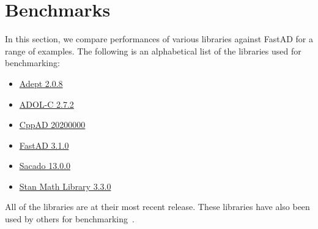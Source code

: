 \section{Benchmarks}\label{sec:benchmark}

In this section, we compare performances of 
various libraries against FastAD for a range of examples\footnotemark.
The following is an alphabetical list of the libraries used for benchmarking:\@
\begin{itemize}
    \item \href{http://www.met.reading.ac.uk/clouds/adept/}{Adept 2.0.8}~\cite{hogan:2014}
    \item \href{https://github.com/coin-or/ADOL-C}{ADOL-C 2.7.2}~\cite{griewank:1996}
    \item \href{https://coin-or.github.io/CppAD/doc/cppad.htm}{CppAD 20200000}~\cite{bell:2020}
    \item \href{https://github.com/JamesYang007/FastAD}{FastAD 3.1.0}
    \item \href{https://github.com/trilinos/Trilinos/tree/master/packages/sacado}{Sacado 13.0.0}~\cite{phipps:2009}
    \item \href{https://github.com/stan-dev/math}{Stan Math Library 3.3.0}~\cite{carpenter:2015}
\end{itemize}
All of the libraries are at their most recent release.
These libraries have also been used by others for 
benchmarking~\cite{carpenter:2015}\cite{margossian:2018}\cite{hogan:2014}.


